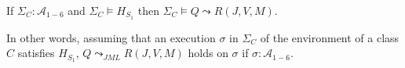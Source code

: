 \begin{theorem}%
  \label{until} 
If $\Sigma_C : \mathcal{A}_{1-6}$ and $\Sigma_C \models H_{S_1}$ then 
$\Sigma_C \models Q \leadsto R (J,V,M)$. 
\end{theorem}

In other words, assuming that an execution $\sigma$ in $\Sigma_C$ of the
environment of a class $C$ satisfies $H_{S_1}$, \(Q
\leadsto_{\mathit{JML}} R (J, V, M)\) holds on $\sigma$ if $\sigma :
\mathcal{A}_{1-6}$.






